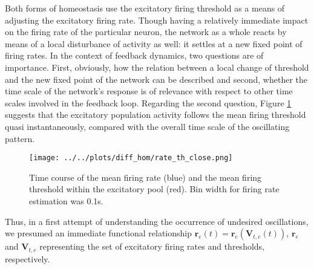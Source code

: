 \documentclass[10pt,a4paper]{article}
\begin{document}
Both forms of homeostasis use the excitatory firing threshold as a means of adjusting the excitatory firing rate. Though having a relatively immediate impact on the firing rate of the particular neuron, the network as a whole reacts by means of a local disturbance of activity as well: it settles at a new fixed point of firing rates. In the context of feedback dynamics, two questions are of importance. First, obviously, how the relation between a local change of threshold and the new fixed point of the network can be described and second, whether the time scale of the network's response is of relevance with respect to other time scales involved in the feedback loop. Regarding the second question, Figure \ref{rate_th_close} suggests that the excitatory population activity follows the mean firing threshold quasi instantaneously, compared with the overall time scale of the oscillating pattern.
\begin{figure}
\begin{center}
\texttt{[image: ../../plots/diff\_hom/rate\_th\_close.png]}
\end{center}
\caption{Time course of the mean firing rate (blue) and the mean firing threshold within the excitatory pool (red). Bin width for firing rate estimation was 0.1s.}
\label{rate_th_close}
\end{figure}
Thus, in a first attempt of understanding the occurrence of undesired oscillations, we presumed an immediate functional relationship $\mathbf{r}_e (t) = \mathbf{r}_e (\mathbf{V}_{t,e} (t))$, $\mathbf{r}_e$ and $\mathbf{V}_{t,e}$ representing the set of excitatory firing rates and thresholds, respectively.
\end{document}

